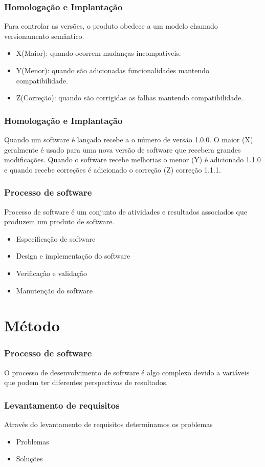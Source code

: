 \documentclass{beamer}
\begin{document}
	\begin{frame}\frametitle{Homologação e Implantação}
		Para controlar as versões, o produto obedece a um modelo chamado versionamento semântico.
		\begin{itemize}
			\item X(Maior): quando ocorrem mudanças incompatíveis.
			\item Y(Menor): quando são adicionadas funcionalidades mantendo compatibilidade.
			\item Z(Correção): quando são corrigidas as falhas mantendo compatibilidade.
		\end{itemize}
	\end{frame}

	\begin{frame}\frametitle{Homologação e Implantação}
		Quando um software é lançado recebe a o número de versão 1.0.0. O maior (X) geralmente é usado para uma nova versão de software que recebera grandes modificações.
		Quando o software recebe melhorias o menor (Y) é adicionado 1.1.0 e quando recebe correções é adicionado o correção (Z) correção 1.1.1.
	\end{frame}

	\begin{frame}\frametitle{Processo de software}
		Processo de software é um conjunto de atividades e resultados associados que produzem um produto de software.
		\begin{itemize}
			\item Especificação de software
			\item Design e implementação do software
			\item Verificação e validação
			\item Manutenção do software
		\end{itemize}
	\end{frame}

	\section{Método}
	
		\begin{frame}\frametitle{Processo de software}
			
			O processo de desenvolvimento de software é algo complexo devido a variáveis que podem ter diferentes perspectivas de resultados.
		\end{frame}
	
		\begin{frame}\frametitle{Levantamento de requisitos}
			Através do levantamento de requisitos determinamos os problemas
			\begin{itemize}
				\item Problemas
				\item Soluções
			\end{itemize}
		\end{frame}
	
\end{document}
